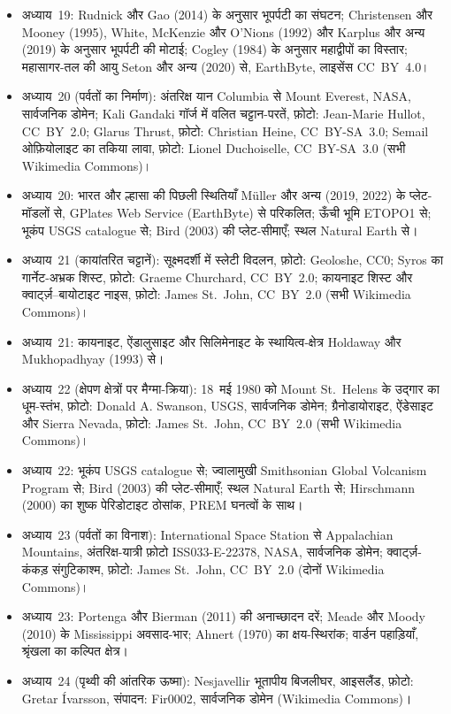 \begin{itemize}
  \item अध्याय~19: Rudnick और Gao (2014) के अनुसार भूपर्पटी का संघटन; Christensen और Mooney (1995), White, McKenzie और O'Nions (1992) और Karplus और अन्य (2019) के अनुसार भूपर्पटी की मोटाई; Cogley (1984) के अनुसार महाद्वीपों का विस्तार; महासागर-तल की आयु Seton और अन्य (2020) से, EarthByte, लाइसेंस CC~BY~4.0।
  \item अध्याय~20 (पर्वतों का निर्माण): अंतरिक्ष यान Columbia से Mount Everest, NASA, सार्वजनिक डोमेन; Kali Gandaki गॉर्ज में वलित चट्टान-परतें, फ़ोटो: Jean-Marie Hullot, CC~BY~2.0; Glarus Thrust, फ़ोटो: Christian Heine, CC~BY-SA~3.0; Semail ओफ़ियोलाइट का तकिया लावा, फ़ोटो: Lionel Duchoiselle, CC~BY-SA~3.0 (सभी Wikimedia Commons)।
  \item अध्याय~20: भारत और ल्हासा की पिछली स्थितियाँ Müller और अन्य (2019, 2022) के प्लेट-मॉडलों से, GPlates Web Service (EarthByte) से परिकलित; ऊँची भूमि ETOPO1 से; भूकंप USGS catalogue से; Bird (2003) की प्लेट-सीमाएँ; स्थल Natural Earth से।
  \item अध्याय~21 (कायांतरित चट्टानें): सूक्ष्मदर्शी में स्लेटी विदलन, फ़ोटो: Geoloshe, CC0; Syros का गार्नेट-अभ्रक शिस्ट, फ़ोटो: Graeme Churchard, CC~BY~2.0; कायनाइट शिस्ट और क्वार्ट्ज़--बायोटाइट नाइस, फ़ोटो: James St.~John, CC~BY~2.0 (सभी Wikimedia Commons)।
  \item अध्याय~21: कायनाइट, ऐंडालुसाइट और सिलिमेनाइट के स्थायित्व-क्षेत्र Holdaway और Mukhopadhyay (1993) से।
  \item अध्याय~22 (क्षेपण क्षेत्रों पर मैग्मा-क्रिया): 18~मई 1980 को Mount St.~Helens के उद्गार का धूम-स्तंभ, फ़ोटो: Donald A. Swanson, USGS, सार्वजनिक डोमेन; ग्रैनोडायोराइट, ऐंडेसाइट और Sierra Nevada, फ़ोटो: James St.~John, CC~BY~2.0 (सभी Wikimedia Commons)।
  \item अध्याय~22: भूकंप USGS catalogue से; ज्वालामुखी Smithsonian Global Volcanism Program से; Bird (2003) की प्लेट-सीमाएँ; स्थल Natural Earth से; Hirschmann (2000) का शुष्क पेरिडोटाइट ठोसांक, PREM घनत्वों के साथ।
  \item अध्याय~23 (पर्वतों का विनाश): International Space Station से Appalachian Mountains, अंतरिक्ष-यात्री फ़ोटो ISS033-E-22378, NASA, सार्वजनिक डोमेन; क्वार्ट्ज़-कंकड़ संगुटिकाश्म, फ़ोटो: James St.~John, CC~BY~2.0 (दोनों Wikimedia Commons)।
  \item अध्याय~23: Portenga और Bierman (2011) की अनाच्छादन दरें; Meade और Moody (2010) के Mississippi अवसाद-भार; Ahnert (1970) का क्षय-स्थिरांक; वार्डन पहाड़ियाँ, श्रृंखला का कल्पित क्षेत्र।
  \item अध्याय~24 (पृथ्वी की आंतरिक ऊष्मा): Nesjavellir भूतापीय बिजलीघर, आइसलैंड, फ़ोटो: Gretar Ívarsson, संपादन: Fir0002, सार्वजनिक डोमेन (Wikimedia Commons)।

\end{itemize}
